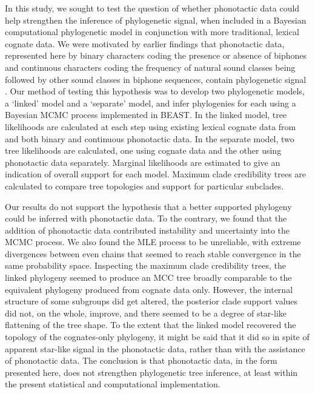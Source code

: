 In this study, we sought to test the question of whether phonotactic data could help strengthen the inference of phylogenetic signal, when included in a Bayesian computational phylogenetic model in conjunction with more traditional, lexical cognate data. We were motivated by earlier findings that phonotactic data, represented here by binary characters coding the presence or absence of biphones and continuous characters coding the frequency of natural sound classes being followed by other sound classes in biphone sequences, contain phylogenetic signal \autocite{macklin-cordes_phylogenetic_2021}. Our method of testing this hypothesis was to develop two phylogenetic models, a `linked' model and a `separate' model, and infer phylogenies for each using a Bayesian MCMC process implemented in BEAST. In the linked model, tree likelihoods are calculated at each step using existing lexical cognate data from \textcite{bouckaert_origin_2018} and both binary and continuous phonotactic data. In the separate model, two tree likelihoods are calculated, one using cognate data and the other using phonotactic data separately. Marginal likelihoods are estimated to give an indication of overall support for each model. Maximum clade credibility trees are calculated to compare tree topologies and support for particular subclades.

Our results do not support the hypothesis that a better supported phylogeny could be inferred with phonotactic data. To the contrary, we found that the addition of phonotactic data contributed instability and uncertainty into the MCMC process. We also found the MLE process to be unreliable, with extreme divergences between even chains that seemed to reach stable convergence in the same probability space. Inspecting the maximum clade credibility trees, the linked phylogeny seemed to produce an MCC tree broadly comparable to the equivalent phylogeny produced from cognate data only. However, the internal structure of some subgroups did get altered, the posterior clade support values did not, on the whole, improve, and there seemed to be a degree of star-like flattening of the tree shape. To the extent that the linked model recovered the topology of the cognates-only phylogeny, it might be said that it did so in spite of apparent star-like signal in the phonotactic data, rather than with the assistance of phonotactic data. The conclusion is that phonotactic data, in the form presented here, does not strengthen phylogenetic tree inference, at least within the present statistical and computational implementation.

